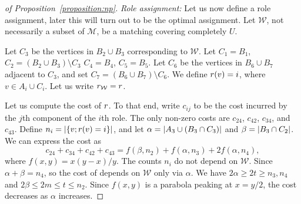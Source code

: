\begin{proof}[of Proposition~\ref{proposition:np}]
\iffalse
The first part entails vertex sets $A$ and $B$ with $\abs{A} = 3$ and $\abs{B}
= \ell$.  Each vertex $a \in A$ and $b \in B$ is connected with a \emph{fat} edge:
$t$ copies of a path $a$--$x$--$b$, where $x$ is a vertex unique to the path.
Each vertex $a \in A$ is connected to its own clique of size $h$.  Finally, one
vertex, say $b^* \in B$ is connected to an additional vertex, who is also connected
to a biclique $K(s, s)$.

The final graph consists of $t$ copies of the first part.

The second part is very similar to the first.  It entails the vertex sets $A'$
and $B'$ with $\abs{A'} = n$ and $\abs{B'} = h$. Here $A'$ corresponds to the
universe $U$.  Each vertex $a \in A'$ and $b \in B'$ is connected with a
\emph{fat} edge of size $t$.  Finally, let $C'$ be the subset of $B'$ that
corresponds to the sets in $\mathcal{M}$.  Each vertex $c \in C'$ is connected
to its own unique vertex. We will denote these vertices by $O'$.
Each vertex in $O'$ is also connected to its own dedicated bi-clique
$K(s, s)$. 
\fi

\emph{Role assignment:}
Let us now define a role assignment, later this will turn out to be the optimal
assignment. Let $\mathcal{W}$, not necessarily a subset of $\mathcal{M}$, be a
matching covering completely $U$.

Let $C_3$ be the vertices in $B_2 \cup B_3$ corresponding to $\mathcal{W}$.
Let $C_1 = B_1$, $C_2 = (B_2 \cup B_3) \setminus C_3$ $C_4 = B_4$, $C_5 = B_5$.
Let $C_6$ be the vertices in $B_6 \cup B_7$ adjacent to $C_3$, and set $C_7 = (B_6 \cup B_7) \setminus C_6$.
We define $r(v) = i$, where $v \in A_i \cup C_i$.
Let us write $r_{\mathcal{W}} = r$.

Let us compute the cost of $r$.
To that end, write $c_{ij}$ to be the cost incurred by the $j$th component of the $i$th role.
The only non-zero costs are $c_{24}$, $c_{42}$, $c_{34}$, and $c_{43}$.
Define $n_i = {\left|\left\{v ; r(v) = i\right\}\right|}$,
and let $\alpha = {\left|A_3 \cup (B_3 \cap C_3)\right|}$ and $\beta = {\left|B_3 \cap C_2\right|}$.
We can express the cost as
\[
	c_{24} + c_{34} + c_{42} + c_{43} = f(\beta, n_2) + f(\alpha, n_3) + 2f(\alpha, n_4),
\]
where $f(x, y) = x(y - x)/y$.
The counts $n_i$ do not depend on $\mathcal{W}$.
Since $\alpha + \beta = n_4$, so the cost of depends on $\mathcal{W}$ only via $\alpha$.
We have $2\alpha \geq 2t \geq n_3, n_4$ and $2\beta \leq 2m \leq t \leq n_2$.
Since $f(x, y)$ is a parabola peaking at $x = y / 2$,
the cost decreases as $\alpha$ increases.


\end{proof}
